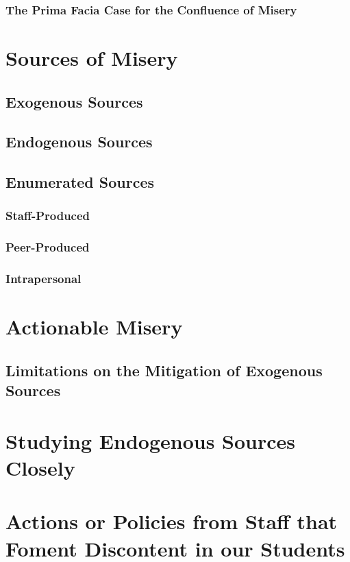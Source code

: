 \documentclass[12pt]{article}
\begin{document}
	\subsubsection{The Prima Facia Case for the Confluence of Misery}

	\section{Sources of Misery}
	\subsection{Exogenous Sources}
	\subsection{Endogenous Sources}
	\subsection{Enumerated Sources}
	\subsubsection{Staff-Produced}
	\subsubsection{Peer-Produced}
	\subsubsection{Intrapersonal}

	\section{Actionable Misery}
	\subsection{Limitations on the Mitigation of Exogenous Sources}

	\section{Studying Endogenous Sources Closely}
	
	\section{Actions or Policies from Staff that Foment Discontent in our Students}
	
\end{document}
